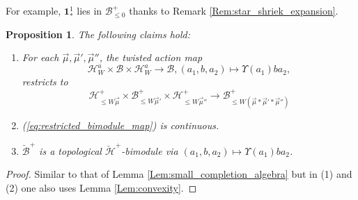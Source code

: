 \documentclass{amsart}
\newcommand{\Hecke}{\mathcal{H}}
\newcommand{\Ring}{\mathsf{R}}
\newcommand{\bone}{\mathbf{1}}
\newcommand{\B}{\mathcal{B}}
\newtheorem{Prop}[Thm]{Proposition}
\theoremstyle{definition}
\numberwithin{equation}{section}
\begin{document}
For example, $\bone_*^1$ lies in $\B^+_{\leqslant 0}$ thanks to Remark \ref{Rem:star_shriek_expansion}.

\begin{Prop}\label{Prop:small_completion_bimodule}
The following claims hold:
\begin{enumerate}
\item For each $\vec{\mu},\vec{\mu}',\vec{\mu}''$, the twisted action map
$$\Hecke^a_W\times\B\times \Hecke^a_W\rightarrow \B,(a_1,b,a_2)\mapsto \Upsilon(a_1)ba_2,$$ restricts to
\begin{equation}\label{eq:restricted_bimodule_map}
\Hecke^+_{\leqslant W\vec{\mu}}\times\B^+_{\leqslant W\vec{\mu}'}\times \Hecke^+_{\leqslant W\vec{\mu}''}\rightarrow \B^+_{\leqslant W(\vec{\mu}*\vec{\mu}'*\vec{\mu}'')}
\end{equation}
\item (\ref{eq:restricted_bimodule_map}) is continuous.
\item $\breve{\B}^+$ is a topological $\breve{\Hecke}^+$-bimodule via $(a_1,b,a_2)\mapsto \Upsilon(a_1)ba_2$.
\end{enumerate}
\end{Prop}
\begin{proof}
Similar to that of Lemma \ref{Lem:small_completion_algebra} but in (1) and (2) one also uses Lemma \ref{Lem:convexity}.
\end{proof}
\end{document}
